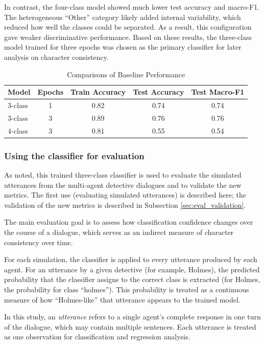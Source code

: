 \documentclass{article}
\begin{document}
In contrast, the four-class model showed much lower test accuracy and macro-F1. The heterogeneous “Other” category likely added internal variability, which reduced how well the classes could be separated. As a result, this configuration gave weaker discriminative performance. Based on these results, the three-class model trained for three epochs was chosen as the primary classifier for later analysis on character consistency. 

\begin{table}[h]
\centering
\begin{tabular}{lcccc}
    \hline
    Model & Epochs & Train Accuracy & Test Accuracy & Test Macro-F1 \\
    \hline
    3-class & 1 & 0.82 & 0.74 & 0.74 \\
    3-class & 3 & 0.89 & 0.76 & 0.76 \\
    4-class & 3 & 0.81 & 0.55 & 0.54 \\
    \hline
    \end{tabular}
\caption{Comparisons of Baseline Performance}
\label{tab:model_compare}
\end{table}

\subsubsection{Using the classifier for evaluation} \label{sec:eval_baseline_4eval}

As noted, this trained three-class classifier is used to evaluate the simulated utterances from the multi-agent detective dialogues and to validate the new metrics. The first use (evaluating simulated utterances) is described here; the validation of the new metrics is described in Subsection \ref{sec:eval_validation}. 

The main evaluation goal is to assess how classification confidence changes over the course of a dialogue, which serves as an indirect measure of character consistency over time. 

For each simulation, the classifier is applied to every utterance produced by each agent. For an utterance by a given detective (for example, Holmes), the predicted probability that the classifier assigns to the correct class is extracted (for Holmes, the probability for class “holmes”). This probability is treated as a continuous measure of how “Holmes-like” that utterance appears to the trained model.

In this study, an \emph{utterance} refers to a single agent's complete response in one turn of the dialogue, which may contain multiple sentences. Each utterance is treated as one observation for classification and regression analysis.
\end{document}
